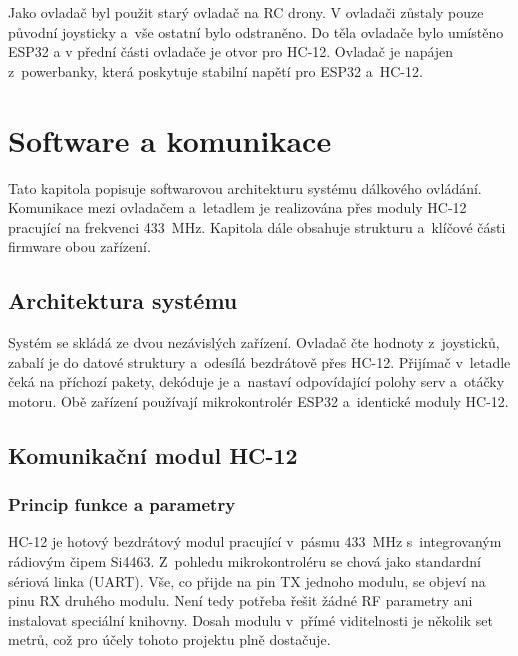 \documentclass[12pt, a4paper, oneside]{report}
\begin{document}
Jako ovladač byl použit starý ovladač na RC drony.
V ovladači zůstaly pouze původní joysticky a~vše ostatní bylo odstraněno.
Do těla ovladače bylo umístěno ESP32 a v přední části ovladače je otvor pro HC-12.
Ovladač je napájen z~powerbanky, která poskytuje stabilní napětí pro ESP32 a~HC-12.




\chapter{Software a komunikace}

Tato kapitola popisuje softwarovou architekturu systému dálkového ovládání.
Komunikace mezi ovladačem a~letadlem je realizována přes moduly HC-12
pracující na frekvenci 433~MHz. Kapitola dále obsahuje strukturu
a~klíčové části firmware obou zařízení.

\section{Architektura systému}

Systém se skládá ze dvou nezávislých zařízení. Ovladač čte hodnoty
z~joysticků, zabalí je do datové struktury a~odesílá bezdrátově
přes HC-12. Přijímač v~letadle čeká na příchozí pakety, dekóduje je
a~nastaví odpovídající polohy serv a~otáčky motoru. Obě zařízení používají
mikrokontrolér ESP32 a~identické moduly HC-12.

\section{Komunikační modul HC-12}

\subsection{Princip funkce a parametry}

HC-12 je hotový bezdrátový modul pracující v~pásmu 433~MHz
s~integrovaným rádiovým čipem Si4463. Z~pohledu mikrokontroléru se chová
jako standardní sériová linka (UART). Vše, co přijde na pin TX jednoho modulu, se objeví na
pinu RX druhého modulu. Není tedy potřeba řešit žádné RF parametry ani
instalovat speciální knihovny. Dosah modulu v~přímé viditelnosti je několik set metrů, což pro účely tohoto projektu plně dostačuje.
\end{document}
